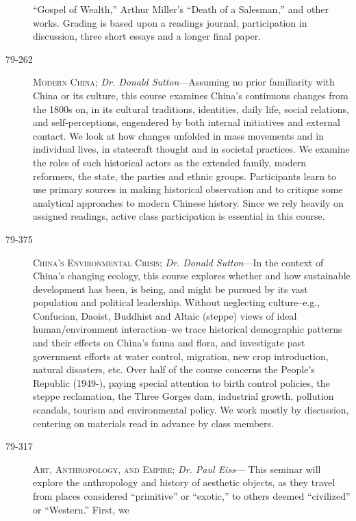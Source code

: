 \begin{description}
        ``Gospel of Wealth,'' Arthur Miller's ``Death of a Salesman,'' and other
        works. Grading is based upon a readings journal, participation in
        discussion, three short essays and a longer final paper.
    \item [79-262] \textsc{Modern China}; \textit{Dr. Donald Sutton}---Assuming
        no prior familiarity with China or its culture, this course examines
        China's continuous changes from the 1800s on, in its cultural
        traditions, identities, daily life, social relations, and
        self-perceptions, engendered by both internal initiatives and external
        contact. We look at how changes unfolded in mass movements and in
        individual lives, in statecraft thought and in societal practices. We
        examine the roles of such historical actors as the extended family,
        modern reformers, the state, the parties and ethnic groups. Participants
        learn to use primary sources in making historical observation and to
        critique some analytical approaches to modern Chinese history. Since we
        rely heavily on assigned readings, active class participation is
        essential in this course.
    \item [79-375] \textsc{China's Environmental Crisis}; \textit{Dr. Donald
        Sutton}---In the context of China's changing ecology, this course
        explores whether and how sustainable development has been, is being, and
        might be pursued by its vast population and political leadership.
        Without neglecting culture--e.g., Confucian, Daoist, Buddhist and Altaic
        (steppe) views of ideal human/environment interaction--we trace
        historical demographic patterns and their effects on China's fauna and
        flora, and investigate past government efforts at water control,
        migration, new crop introduction, natural disasters, etc. Over half of
        the course concerns the People's Republic (1949-), paying special
        attention to birth control policies, the steppe reclamation, the Three
        Gorges dam, industrial growth, pollution scandals, tourism and
        environmental policy. We work mostly by discussion, centering on
        materials read in advance by class members.
    \item [79-317] \textsc{Art, Anthropology, and Empire}; \textit{Dr. Paul
        Eiss}--- This seminar will explore the anthropology and history of
        aesthetic objects, as they travel from places considered ``primitive''
        or ``exotic,'' to others deemed ``civilized'' or ``Western.'' First, we

\end{description}

